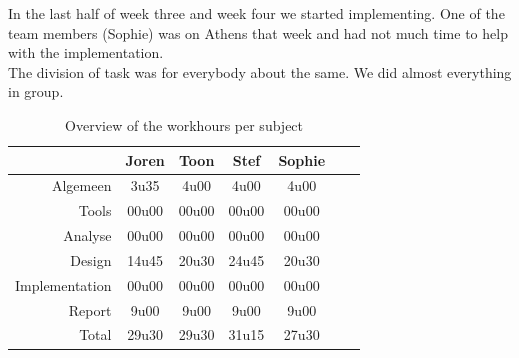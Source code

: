 \documentclass[i2]{oss}
\begin{document}
In the last half of week three and week four we started  implementing. One of the team members (Sophie) was on Athens that week and had not much time to help with the implementation. \\

The division of task was for everybody about the same. We did almost everything in group. 

\begin{table}[h!]
\begin{center}
    \begin{tabular}{ r | c  c  c  c  c  c}
     & Joren & Toon & Stef & Sophie \\ \hline
    Algemeen & 3u35 & 4u00 & 4u00 & 4u00\\
           Tools & 00u00 & 00u00 & 00u00 & 00u00 \\
        Analyse & 00u00 & 00u00 & 00u00 & 00u00 \\
        Design & 14u45 & 20u30 & 24u45 & 20u30 \\
        Implementation & 00u00 & 00u00 & 00u00 & 00u00\\
        Report & 9u00 & 9u00 & 9u00 & 9u00 \\
        Total & 29u30 & 29u30 & 31u15 & 27u30  
    \end{tabular}
    \caption{Overview of the workhours per subject}
    \label{tab:werkuren}
\end{center}
\end{table}
\end{document}
